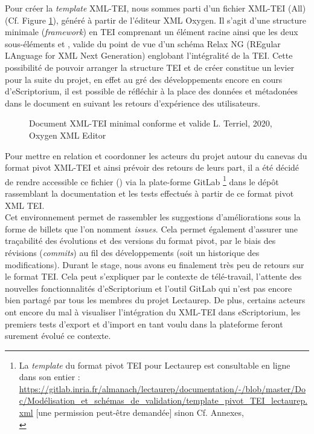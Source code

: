 Pour créer la \textit{template} XML-TEI, nous sommes parti d'un fichier XML-TEI (All) (Cf. Figure \ref{fig:document_minimal_tei}), généré à partir de l'éditeur XML Oxygen. Il s'agit d'une structure minimale (\textit{framework}) en TEI comprenant un élément racine  ainsi que les deux sous-éléments  et , valide du point de vue d'un schéma Relax NG (REgular LAnguage for XML Next Generation) englobant l'intégralité de la TEI.
Cette possibilité de pouvoir arranger la structure TEI et de créer constitue un levier pour la suite du projet, en effet au gré des développements encore en cours d'eScriptorium, il est possible de réfléchir à la place des données et métadonées dans le document en suivant les retours d'expérience des utilisateurs.    
\begin{figure}[h]
    \centering
    \centerline{}
    \caption{Document XML-TEI minimal conforme et valide  \textcopyright L. Terriel, 2020, Oxygen XML Editor}
    \label{fig:document_minimal_tei}
\end{figure}

Pour mettre en relation et coordonner les acteurs du projet autour du canevas du format pivot XML-TEI et ainsi prévoir des retours de leurs part, il a été décidé de rendre accessible ce fichier () via la plate-forme GitLab \footnote{La \textit{template} du format pivot TEI pour Lectaurep est consultable en ligne dans son entier : \url{https://gitlab.inria.fr/almanach/lectaurep/documentation/-/blob/master/Doc/Modélisation_et_schémas_de_validation/template_pivot_TEI_lectaurep.xml} [une permission peut-être demandée] sinon Cf. Annexes,\\ } dans le dépôt rassemblant la documentation et les tests effectués à partir de ce format pivot XML TEI.\\

Cet environnement permet de rassembler les suggestions d'améliorations sous la forme de billets que l'on nomment \textit{issues}. Cela permet également d'assurer une traçabilité des évolutions et des versions du format pivot, par le biais des révisions (\textit{commits}) au fil des développements (soit un historique des modifications). Durant le stage, nous avons eu finalement très peu de retours sur le format TEI. Cela peut s'expliquer par le contexte de télé-travail, l'attente des nouvelles fonctionnalités d'eScriptorium et l'outil GitLab qui n'est pas encore bien partagé par tous les membres du projet Lectaurep. De plus, certains acteurs ont encore du mal à visualiser l'intégration du XML-TEI dans eScriptorium, les premiers tests d'export et d'import en tant voulu dans la plateforme feront surement évolué ce contexte. 

